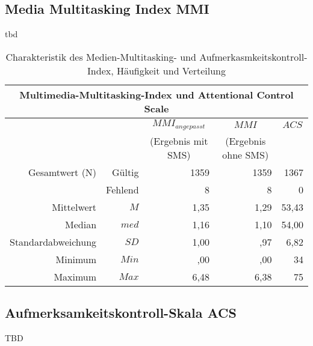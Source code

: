 \subsection{Media Multitasking Index MMI}
tbd
\begin{table}[ht] 
    \centering
    \caption{Charakteristik des Medien-Multitasking- und Aufmerkasmkeitskontroll-Index, Häufigkeit und Verteilung}
    \begin{tabular}[t]{|r r|r|r|r|} 
        \hline
        \multicolumn{5}{|c|}{\textbf{Multimedia-Multitasking-Index und Attentional Control Scale}}\\ 
        \hline       
        \multicolumn{2}{|c}{} & \multicolumn{1}{c|}{$MMI_{angepasst}$} & \multicolumn{1}{|c|}{$MMI$}& \multicolumn{1}{c|}{$ACS$}\\
        \multicolumn{2}{|c}{} & \multicolumn{1}{c|}{(Ergebnis mit SMS)} & \multicolumn{1}{|c|}{(Ergebnis ohne SMS)}& \multicolumn{1}{c|}{}\\
        \hline
        Gesamtwert (N) & Gültig & 1359 & 1359 & 1367\\
        & Fehlend & 8 & 8 & 0\\
        Mittelwert & $M$ & 1,35 & 1,29 & 53,43\\
        Median & $med$ & 1,16 & 1,10 & 54,00\\
        Standardabweichung & $SD$ & 1,00 & ,97 & 6,82\\
        Minimum & $Min$ & ,00 & ,00 & 34\\
        Maximum & $Max$ & 6,48 & 6,38 & 75\\
        \hline
    \end{tabular}
    \label{table.deskrptMedienAttent}
\end{table}
\subsection{Aufmerksamkeitskontroll-Skala ACS}
TBD

